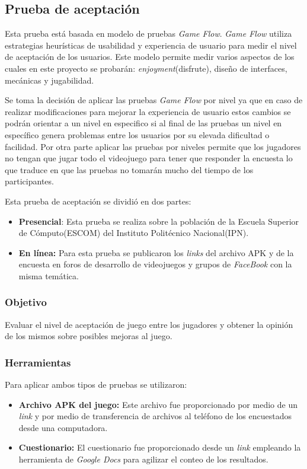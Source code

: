 \subsection{Prueba de aceptación} \label{Cuestionario}
Esta prueba está basada en modelo de pruebas \textit{Game Flow}\cite{gameflow}.
\textit{Game Flow} utiliza estrategias heurísticas de usabilidad y experiencia
de usuario para medir el nivel de aceptación de los usuarios. Este modelo permite
medir varios aspectos de los cuales en este proyecto se probarán:
{\it enjoyment}(disfrute), diseño de interfaces, mecánicas y jugabilidad.
\\
\par
Se toma la decisión de aplicar las pruebas \textit{Game Flow} por nivel ya que en
caso de realizar modificaciones para mejorar la experiencia de usuario estos
cambios se podrán orientar a un nivel en especifico si al final de las pruebas
un nivel en específico genera problemas entre los usuarios por su elevada
dificultad o facilidad. Por otra parte aplicar las pruebas por niveles permite que los jugadores no tengan que jugar todo el videojuego para tener que responder la encuesta lo que traduce en que las pruebas no tomarán mucho del tiempo de los participantes.
\\
\par
Esta prueba de aceptación se dividió en dos partes:
\begin{itemize}
    \item \textbf{Presencial}: Esta prueba se realiza sobre la población de la
    Escuela Superior de Cómputo(ESCOM) del Instituto Politécnico Nacional(IPN).   
    \item \textbf{En línea:} Para esta prueba se publicaron los \textit{links} del
    archivo APK y de la encuesta en foros de desarrollo de videojuegos y grupos
    de \textit{FaceBook} con la misma temática.
\end{itemize}
 
\subsubsection{Objetivo}
Evaluar el nivel de aceptación de juego entre los jugadores y obtener la opinión
de los mismos sobre posibles mejoras al juego.

\subsubsection{Herramientas}
Para aplicar ambos tipos de pruebas se utilizaron:
    \begin{itemize}
        \item \textbf{Archivo APK del juego:} Este archivo fue proporcionado por
        medio de un \textit{link} y por medio de transferencia de archivos al teléfono
        de los encuestados desde una computadora.
        \item \textbf{Cuestionario:} El cuestionario fue proporcionado desde un
        \textit{link} empleando la herramienta de \textit{Google Docs} para agilizar
        el conteo de los resultados.   
    \end{itemize}

